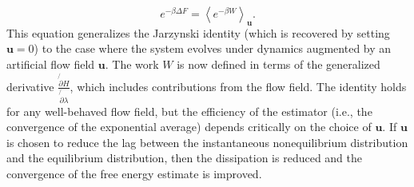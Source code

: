 \begin{equation}
	e^{-\beta \Delta F} = \left\langle e^{-\beta W} \right\rangle_{\mathbf{u}}.
\end{equation}
This equation generalizes the Jarzynski identity (which is recovered by setting $\mathbf{u} = 0$) to the case where the system evolves under dynamics augmented by an artificial flow field $\mathbf{u}$. The work $W$ is now defined in terms of the generalized derivative $\frac{\not{\partial} H}{\not{\partial} \lambda}$, which includes contributions from the flow field. The identity holds for any well-behaved flow field, but the efficiency of the estimator (i.e., the convergence of the exponential average) depends critically on the choice of $\mathbf{u}$. If $\mathbf{u}$ is chosen to reduce the lag between the instantaneous nonequilibrium distribution and the equilibrium distribution, then the dissipation is reduced and the convergence of the free energy estimate is improved.

